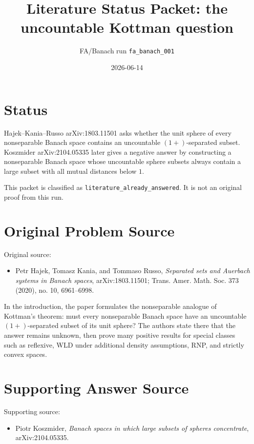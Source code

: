 \documentclass[11pt]{article}
\title{Literature Status Packet: the uncountable Kottman question}
\author{FA/Banach run \texttt{fa\_banach\_001}}
\date{2026-06-14}
\begin{document}
\maketitle

\section*{Status}

Hajek--Kania--Russo arXiv:1803.11501 asks whether the unit sphere of every
nonseparable Banach space contains an uncountable \((1+)\)-separated subset.
Koszmider arXiv:2104.05335 later gives a negative answer by constructing a
nonseparable Banach space whose uncountable sphere subsets always contain a
large subset with all mutual distances below \(1\).

This packet is classified as \texttt{literature\_already\_answered}.  It is
not an original proof from this run.

\section*{Original Problem Source}

Original source:
\begin{itemize}
\item Petr Hajek, Tomasz Kania, and Tommaso Russo,
\emph{Separated sets and Auerbach systems in Banach spaces},
arXiv:1803.11501; Trans. Amer. Math. Soc. 373 (2020), no. 10, 6961--6998.
\end{itemize}

In the introduction, the paper formulates the nonseparable analogue of
Kottman's theorem: must every nonseparable Banach space have an uncountable
\((1+)\)-separated subset of its unit sphere?  The authors state there that the
answer remains unknown, then prove many positive results for special classes
such as reflexive, WLD under additional density assumptions, RNP, and strictly
convex spaces.

\section*{Supporting Answer Source}

Supporting source:
\begin{itemize}
\item Piotr Koszmider,
\emph{Banach spaces in which large subsets of spheres concentrate},
arXiv:2104.05335.
\end{itemize}
\end{document}
